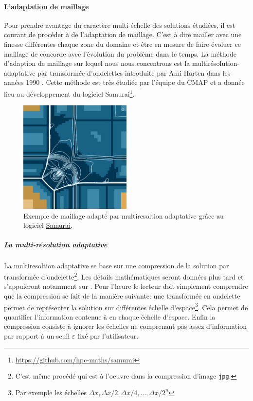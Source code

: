     \paragraph{L'adaptation de maillage}
    Pour prendre avantage du caractère multi-échelle des solutions étudiées, il est courant de procéder à de l'adaptation de maillage.
    C'est à dire mailler avec une finesse différentes chaque zone du domaine et être en mesure de faire évoluer ce maillage de concorde avec l'évolution du problème dans le temps.
    La méthode d'adaption de maillage sur lequel nous nous concentrons est la multirésolution-adaptative par transformée d'ondelettes introduite par Ami Harten dans les années 1990 \cite{harten1994}.
    Cette méthode est très étudiée par l'équipe du CMAP et a donnée lieu au développement du logiciel Samurai\footnote{\href{https://github.com/hpc-maths/samurai}{https://github.com/hpc-maths/samurai}}.
    \begin{figure}[h]
    \centering
    \includegraphics[width=0.5\textwidth]{media/3_/3_/exemple_compression_samurai.png}
    \caption{Exemple de maillage adapté par multiresoltion adaptative grâce au logiciel \href{https://github.com/hpc-maths/samurai}{Samurai}.}
    \label{fig:samurai}
    \end{figure}

        \subparagraph{La multi-résolution adaptative}
        La multiresoltion adaptative se base sur une compression de la solution par transformée d'ondelette\footnote{C'est même procédé qui est à l'oeuvre dans la compression d'image \texttt{jpg}.}.
        Les détails mathématiques seront données plus tard et s’appuieront notamment sur \cite{postePoly}. Pour l'heure le lecteur doit simplement comprendre que la compression se fait de la manière suivante:
        une transformée en ondelette permet de représenter la solution sur différentes échelle d'espace\footnote{Par exemple les échelles $\Delta x, \Delta x/2,\Delta x/4,\dots, \Delta x/2^n$}. 
        Cela permet de quantifier l'information contenue à en chaque échelle d'espace. Enfin la compression consiste à ignorer les échelles ne comprenant pas assez d'information
        par rapport à un seuil $\varepsilon$ fixé par l'utilisateur.

